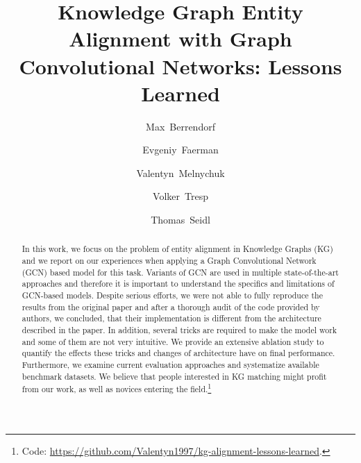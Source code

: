 \documentclass[runningheads]{llncs}
\begin{document}
\title{Knowledge Graph Entity Alignment with Graph Convolutional Networks: Lessons Learned}
\author{
Max~Berrendorf \and Evgeniy~Faerman \and Valentyn~Melnychuk \and Volker~Tresp \and Thomas~Seidl }
\maketitle              \begin{abstract}
In this work, we focus on the problem of entity alignment in Knowledge Graphs (KG) and we report on our experiences when applying a Graph Convolutional Network (GCN) based model for this task.
Variants of GCN are used in multiple state-of-the-art approaches and therefore it is important to understand the specifics and limitations of GCN-based models. 
Despite serious efforts, we were not able to fully reproduce the results from the original paper and after a thorough audit of the code provided by authors, we concluded, that their implementation is different from the architecture described in the paper.
In addition, several tricks are required to make the model work and some of them are not very intuitive. 
We provide an extensive ablation study to quantify the effects these tricks and changes of architecture have on final performance.
Furthermore, we examine current evaluation approaches and systematize available benchmark datasets.
We believe that people interested in KG matching might profit from our work, as well as novices entering the field.\footnote{Code: \href{https://github.com/Valentyn1997/kg-alignment-lessons-learned}{https://github.com/Valentyn1997/kg-alignment-lessons-learned}.}

\end{abstract}
\end{document}
